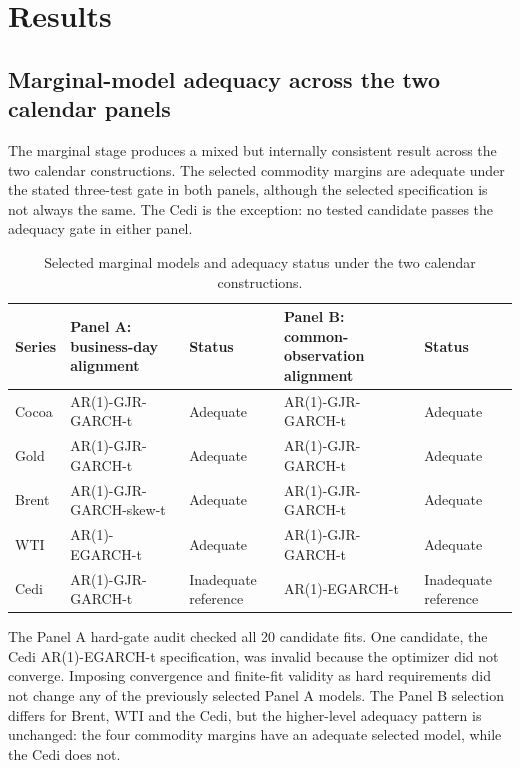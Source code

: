 \section{Results}
\label{sec:results}

\subsection{Marginal-model adequacy across the two calendar panels}

The marginal stage produces a mixed but internally consistent result across the two calendar constructions. The selected commodity margins are adequate under the stated three-test gate in both panels, although the selected specification is not always the same. The Cedi is the exception: no tested candidate passes the adequacy gate in either panel.

\begin{table}[htbp]
\centering
\caption{Selected marginal models and adequacy status under the two calendar constructions.}
\label{tab:marginal-selected}
\small
\begin{tabularx}{\textwidth}{l>{\raggedright\arraybackslash}X>{\raggedright\arraybackslash}p{}>{\raggedright\arraybackslash}X>{\raggedright\arraybackslash}p{}}
\toprule
\textbf{Series} & \textbf{Panel A: business-day alignment} & \textbf{Status} & \textbf{Panel B: common-observation alignment} & \textbf{Status} \\
\midrule
Cocoa & AR(1)-GJR-GARCH-t & Adequate & AR(1)-GJR-GARCH-t & Adequate \\
Gold & AR(1)-GJR-GARCH-t & Adequate & AR(1)-GJR-GARCH-t & Adequate \\
Brent & AR(1)-GJR-GARCH-skew-t & Adequate & AR(1)-GJR-GARCH-t & Adequate \\
WTI & AR(1)-EGARCH-t & Adequate & AR(1)-GJR-GARCH-t & Adequate \\
Cedi & AR(1)-GJR-GARCH-t & Inadequate reference & AR(1)-EGARCH-t & Inadequate reference \\
\bottomrule
\end{tabularx}
\end{table}

The Panel A hard-gate audit checked all 20 candidate fits. One candidate, the Cedi AR(1)-EGARCH-t specification, was invalid because the optimizer did not converge. Imposing convergence and finite-fit validity as hard requirements did not change any of the previously selected Panel A models. The Panel B selection differs for Brent, WTI and the Cedi, but the higher-level adequacy pattern is unchanged: the four commodity margins have an adequate selected model, while the Cedi does not.

